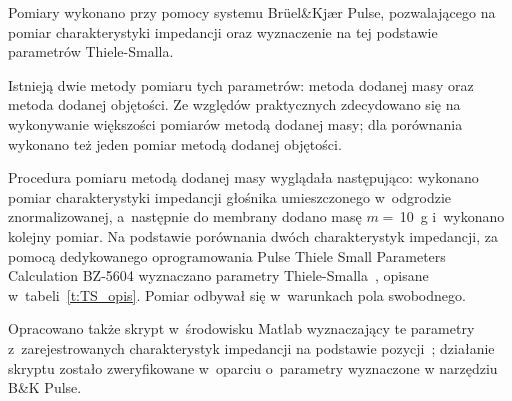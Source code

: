 \documentclass[12pt]{oska}
\begin{document}
	Pomiary wykonano przy pomocy systemu Brüel\&Kjær Pulse, pozwalającego na pomiar charakterystyki impedancji oraz wyznaczenie na tej podstawie parametrów Thiele-Smalla.
	
	Istnieją dwie metody pomiaru tych parametrów: metoda dodanej masy oraz metoda dodanej objętości. Ze względów praktycznych zdecydowano się na wykonywanie większości pomiarów metodą dodanej masy; dla porównania wykonano też jeden pomiar metodą dodanej objętości.
	
	Procedura pomiaru metodą dodanej masy wyglądała następująco: wykonano pomiar charakterystyki impedancji głośnika umieszczonego w~odgrodzie znormalizowanej, a~następnie do membrany dodano masę $m=\,$\SI{10}{\gram} i~wykonano kolejny pomiar. Na podstawie porównania dwóch charakterystyk impedancji, za pomocą dedykowanego oprogramowania Pulse Thiele Small Parameters Calculation BZ-5604 wyznaczano parametry Thiele-Smalla~\cite{BK_pulse_TS}, opisane w~tabeli~\ref{t:TS_opis}. Pomiar odbywał się w~warunkach pola swobodnego.
	
	Opracowano także skrypt w~środowisku Matlab wyznaczający te parametry z~zarejestrowanych charakterystyk impedancji na podstawie pozycji~\cite{dobrucki}; działanie skryptu zostało zweryfikowane w~oparciu o~parametry wyznaczone w narzędziu B\&K Pulse.
	
\end{document}
